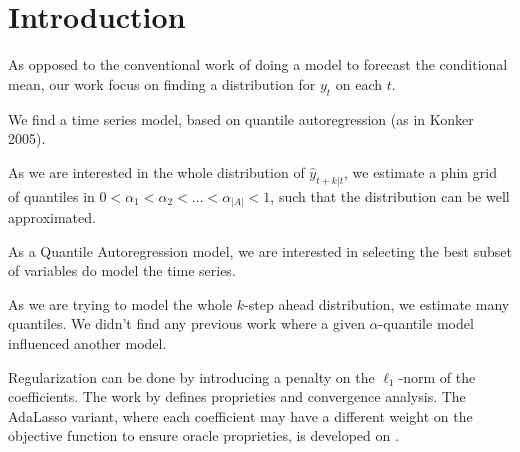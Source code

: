 \section{Introduction}

As opposed to the conventional work of doing a model to forecast the
conditional mean, our work focus on finding a distribution for $y_{t}$
on each $t$. 

We find a time series model, based on quantile autoregression (as
in Konker 2005).

As we are interested in the whole distribution of $\hat{y}_{t+k|t}$,
we estimate a phin grid of quantiles in $0<\alpha_{1}<\alpha_{2}<\dots<\alpha_{|A|}<1$,
such that the distribution can be well approximated.

As a Quantile Autoregression model, we are interested in selecting
the best subset of variables do model the time series. 

As we are trying to model the whole $k$-step ahead distribution,
we estimate many quantiles. We didn't find any previous work where
a given $\alpha$-quantile model influenced another model.



Regularization can be done by introducing a penalty on the $\ell_1$-norm of the coefficients. The work by \cite{belloni_l1-penalized_2009} defines proprieties and convergence analysis. The AdaLasso variant, where each coefficient may have a different weight on the objective function to ensure oracle proprieties, is developed on \cite{ciuperca_adaptive_2016}.